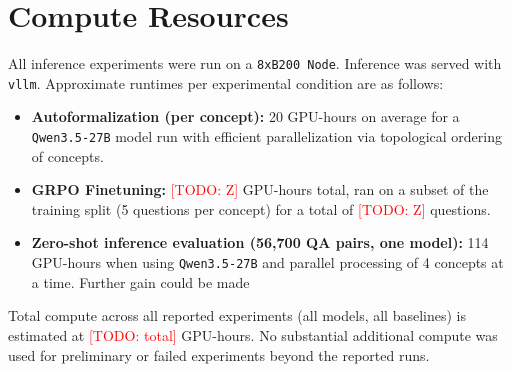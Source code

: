 
\section{Compute Resources}
\label{app:compute}

All inference experiments were run on a \texttt{8xB200 Node}. Inference was served with \texttt{vllm}. Approximate runtimes per experimental condition are as follows:

\begin{itemize}[nosep]
    \item \textbf{Autoformalization (per concept):} 20 GPU-hours on average for a \texttt{Qwen3.5-27B} model run with efficient parallelization via topological ordering of concepts.
    \item \textbf{GRPO Finetuning:} \textcolor{red}{[TODO: Z]} GPU-hours total, ran on a subset of the training split (5 questions per concept) for a total of \textcolor{red}{[TODO: Z]} questions.
    \item \textbf{Zero-shot inference evaluation (56{,}700 QA pairs, one model):} 114 GPU-hours when using \texttt{Qwen3.5-27B} and parallel processing of 4 concepts at a time. Further gain could be made
\end{itemize}

Total compute across all reported experiments (all models, all baselines) is estimated at \textcolor{red}{[TODO: total]} GPU-hours. No substantial additional compute was used for preliminary or failed experiments beyond the reported runs.
